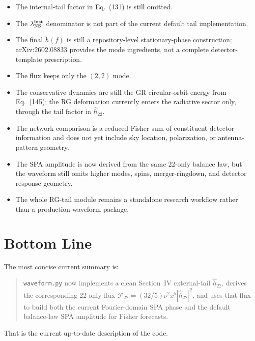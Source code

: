 \documentclass[11pt]{article}
\begin{document}
\begin{itemize}
  \item The internal-tail factor in Eq.~(131) is still omitted.
  \item The \(\lambda_{\rm NS}^{\rm inst}\) denominator is not part of the
  current default tail implementation.
  \item The final \(\tilde h(f)\) is still a repository-level stationary-phase
  construction; arXiv:2602.08833 provides the mode ingredients, not a complete
  detector-template prescription.
  \item The flux keeps only the \((2,2)\) mode.
  \item The conservative dynamics are still the GR circular-orbit energy from
  Eq.~(145); the RG deformation currently enters the radiative sector only,
  through the tail factor in \(\hat h_{22}\).
  \item The network comparison is a reduced Fisher sum of constituent detector
  information and does not yet include sky location, polarization, or
  antenna-pattern geometry.
  \item The SPA amplitude is now derived from the same 22-only balance law, but
  the waveform still omits higher modes, spins, merger-ringdown, and detector
  response geometry.
  \item The whole RG-tail module remains a standalone research workflow rather
  than a production waveform package.
\end{itemize}

\section{Bottom Line}

The most concise current summary is:
\begin{quote}
\texttt{waveform.py} now implements a clean Section~IV external-tail
\(\hat h_{22}\), derives the corresponding 22-only flux
\(\mathcal F_{22}=(32/5)\nu^2 x^5 |\hat h_{22}|^2\), and uses that flux to
build both the current Fourier-domain SPA phase and the default balance-law
SPA amplitude for Fisher forecasts.
\end{quote}

That is the current up-to-date description of the code.
\end{document}
